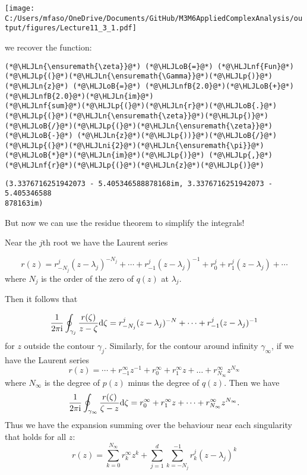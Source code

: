 \documentclass[12pt,landscape]{article}
\newcommand{\HLJLn}[1]{#1}
\newcommand{\HLJLnf}[1]{\textcolor[RGB]{66,102,213}{#1}}
\newcommand{\HLJLnfB}[1]{\textcolor[RGB]{59,151,46}{#1}}
\newcommand{\HLJLni}[1]{\textcolor[RGB]{59,151,46}{#1}}
\newcommand{\HLJLoB}[1]{\textcolor[RGB]{102,102,102}{\textbf{#1}}}
\newcommand{\HLJLp}[1]{#1}
\def\D{ {\rm d} }
\def\I{ {\rm i} }
\def\cent#1{\begin{center}#1\end{center} }
\begin{document}
{\cent{\texttt{[image: C:/Users/mfaso/OneDrive/Documents/GitHub/M3M6AppliedComplexAnalysis/output/figures/Lecture11\_3\_1.pdf]}}

we recover the function:


\begin{lstlisting}
(*@\HLJLn{\ensuremath{\zeta}}@*) (*@\HLJLoB{=}@*) (*@\HLJLnf{Fun}@*)(*@\HLJLp{(}@*)(*@\HLJLn{\ensuremath{\Gamma}}@*)(*@\HLJLp{)}@*)
(*@\HLJLn{z}@*) (*@\HLJLoB{=}@*) (*@\HLJLnfB{2.0}@*)(*@\HLJLoB{+}@*)(*@\HLJLnfB{2.0}@*)(*@\HLJLn{im}@*)
(*@\HLJLnf{sum}@*)(*@\HLJLp{(}@*)(*@\HLJLn{r}@*)(*@\HLJLoB{.}@*)(*@\HLJLp{(}@*)(*@\HLJLn{\ensuremath{\zeta}}@*)(*@\HLJLp{)}@*)(*@\HLJLoB{/}@*)(*@\HLJLp{(}@*)(*@\HLJLn{\ensuremath{\zeta}}@*) (*@\HLJLoB{-}@*) (*@\HLJLn{z}@*)(*@\HLJLp{))}@*)(*@\HLJLoB{/}@*)(*@\HLJLp{(}@*)(*@\HLJLni{2}@*)(*@\HLJLn{\ensuremath{\pi}}@*)(*@\HLJLoB{*}@*)(*@\HLJLn{im}@*)(*@\HLJLp{)}@*) (*@\HLJLp{,}@*) (*@\HLJLnf{r}@*)(*@\HLJLp{(}@*)(*@\HLJLn{z}@*)(*@\HLJLp{)}@*)
\end{lstlisting}

\begin{lstlisting}
(3.3376716251942073 - 5.405346588878168im, 3.3376716251942073 - 5.405346588
878163im)
\end{lstlisting}


But now we can use the residue theorem to simplify the integrals!

Near the $j$th root we have the Laurent series

\[
r(z) = r_{-N_j}^j (z-\lambda_j)^{-N_j}  + \cdots + r_{-1}^j (z-\lambda_j)^{-1} + r_0^j + r_1^j (z-\lambda_j) + \cdots
\]
where $N_j$ is the order of the zero of $q(z)$ at $\lambda_j$.

Then it follows that

\[
{1 \over 2 \pi \I} \oint_{\gamma_j} {r(\zeta) \over z - \zeta} \D\zeta =
r_{-N_j}^j (z-\lambda_j)^{-N}  + \cdots + r_{-1}^j (z-\lambda_j)^{-1}
\]
for $z$ outside the contour $\gamma_j$.
\newpage
Similarly, for the contour around infinity $\gamma_\infty$, if we have the Laurent series
\[
r(z) = \cdots + r_{-1}^\infty z^{-1} + r_0^\infty  + r_1^\infty z + \dots + r_{N_{\infty}}^\infty z^{N_{\infty}}
\]
where $N_\infty$ is the degree of $p(z)$ minus the degree of $q(z)$. Then we have
\[
{1 \over 2 \pi \I} \oint_{\gamma_\infty} {r(\zeta) \over \zeta - z} \D\zeta =
r_0^\infty + r_1^\infty z + \cdots +  r_{N_{\infty}}^\infty z^{N_{\infty}}.
\]
Thus we have the expansion summing over the behaviour near each singularity that holds for all $z$:
\[
r(z) = \sum_{k=0}^{N_\infty} r_k^\infty z^k  +  \sum_{j=1}^d \sum_{k = -N_j}^{-1} r_k^j (z - \lambda_j)^k
\]

}
\end{document}
